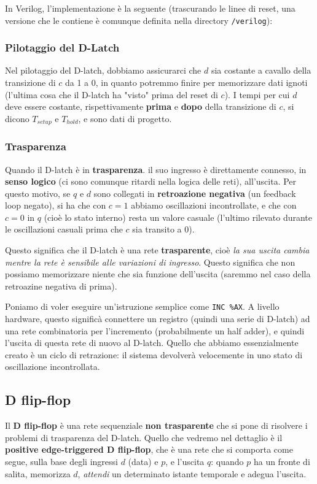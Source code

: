\documentclass[a4paper,11pt]{article}
\begin{document}
In Verilog, l'implementazione è la seguente (trascurando le linee di reset, una versione che le contiene è comunque definita nella directory \lstinline|/verilog|):



\subsubsection{Pilotaggio del D-Latch}
Nel pilotaggio del D-latch, dobbiamo assicurarci che $d$ sia costante a cavallo della transizione di $c$ da 1 a 0, in quanto potremmo finire per memorizzare dati ignoti (l'ultima cosa che il D-latch ha "visto" prima del reset di $c$).
I tempi per cui $d$ deve essere costante, rispettivamente \textbf{prima} e \textbf{dopo} della transizione di $c$, si dicono $T_{setup}$ e $T_{hold}$, e sono dati di progetto.

\subsubsection{Trasparenza}
Quando il D-latch è in \textbf{trasparenza}. il suo ingresso è direttamente connesso, in \textbf{senso logico} (ci sono comunque ritardi nella logica delle reti), all'uscita.
Per questo motivo, se $q$ e $d$ sono collegati in \textbf{retroazione negativa} (un feedback loop negato), si ha che con $c=1$ abbiamo oscillazioni incontrollate, e che con $c=0$ in $q$ (cioè lo stato interno) resta un valore casuale (l'ultimo rilevato durante le oscillazioni casuali prima che $c$ sia transito a 0).

Questo significa che il D-latch è una rete \textbf{trasparente}, cioè \textit{la sua uscita cambia mentre la rete è sensibile alle variazioni di ingresso}.
Questo significa che non possiamo memorizzare niente che sia funzione dell'uscita (saremmo nel caso della retroazine negativa di prima).

Poniamo di voler eseguire un'istruzione semplice come \lstinline|INC %AX|. 
A livello hardware, questo significà connettere un registro (quindi una serie di D-latch) ad una rete combinatoria per l'incremento (probabilmente un half adder), e quindi l'uscita di questa rete di nuovo al D-latch.
Quello che abbiamo essenzialmente creato è un ciclo di retrazione: il sistema devolverà velocemente in uno stato di oscillazione incontrollata.

\subsection{D flip-flop}
Il \textbf{D flip-flop} è una rete sequenziale \textbf{non trasparente} che si pone di risolvere i problemi di trasparenza del D-latch.
Quello che vedremo nel dettaglio è il \textbf{positive edge-triggered D flip-flop}, che è una rete che si comporta come segue, sulla base degli ingressi $d$ (data) e $p$, e l'uscita $q$: quando $p$ ha un fronte di salita, memorizza $d$, \textit{attendi} un determinato istante temporale e adegua l'uscita.
\end{document}
